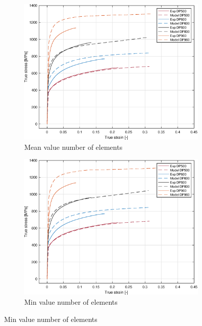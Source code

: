 \documentclass{article}
\begin{document}
\begin{figure}[h!]
     \centering
     \begin{subfigure}[b]{0.3\textwidth}
         \centering
         \includegraphics[width=\textwidth]{MeanMean.eps}
         \caption{Mean value number of elements}
         \label{fig:MeshMean}
     \end{subfigure}
     \hfill
     \begin{subfigure}[b]{0.3\textwidth}
         \centering
         \includegraphics[width=\textwidth]{MeshMin.eps}
         \caption{Min value number of elements}
         \label{fig:MeshMin}
     \end{subfigure}

\end{figure}
\end{document}
